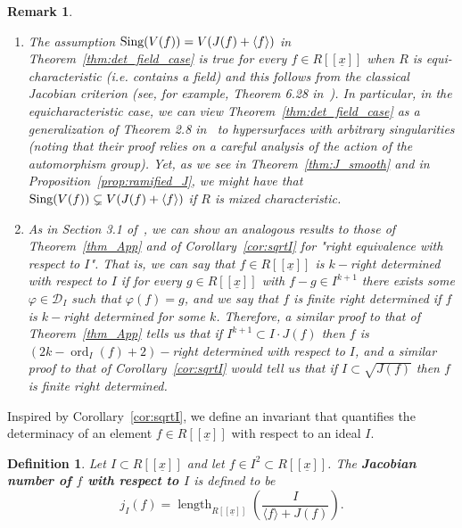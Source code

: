 \documentclass{article}
\newtheorem{definition}[theorem]{Definition}
\newtheorem{remark}[theorem]{Remark}
\DeclareMathOperator{\ord}{ord}
\DeclareMathOperator{\length}{length}
\numberwithin{theorem}{section}
\begin{document}
\begin{remark}
\begin{enumerate}
    \item \textup{The assumption $\textup{Sing}(V(f)) = V(J(f) + \langle f \rangle)$ in Theorem~\ref{thm:det_field_case} is true for every $f \in R[[\underline{x}]]$ when $R$ is equi-characteristic (i.e. contains a field) and this follows from the classical Jacobian criterion (see, for example, Theorem 6.28 in~\cite{gortz2010algebraic}). In particular, in the equicharacteristic case, we can view Theorem~\ref{thm:det_field_case} as a generalization of Theorem 2.8 in~\cite{boubakri2012invariants} to hypersurfaces with arbitrary singularities (noting that their proof relies on a careful analysis of the action of the automorphism group). Yet, as we see in Theorem~\ref{thm:J_smooth} and in Proposition~\ref{prop:ramified_J}, we might have that $\textup{Sing}(V(f)) \subsetneq V(J(f) + \langle f \rangle)$ if $R$ is mixed characteristic.  }
    \item \textup{As in Section 3.1 of~\cite{boubakri2009hypersurface}, we can show an analogous results to those of Theorem~\ref{thm_App} and of Corollary~\ref{cor:sqrtI} for "right equivalence with respect to $I$". That is, we can say that $f \in R[[\underline{x}]]$ is $k-$right determined with respect to $I$ if for every $g \in R[[\underline{x}]]$ with $f-g \in I^{k+1}$ there exists some $\varphi \in \mathcal{D}_I$ such that $\varphi(f)=g$, and we say that $f$ is finite right determined if $f$ is $k-$right determined for some $k$. Therefore, a similar proof to that of Theorem~\ref{thm_App} tells us that if $I^{k+1} \subset I \cdot J(f)$ then $f$ is $(2k-\ord_I(f)+2)-$right determined with respect to $I$, and a similar proof to that of Corollary~\ref{cor:sqrtI} would tell us that if $I \subset \sqrt{J(f)}$ then $f$ is finite right determined.  }
\end{enumerate}
\end{remark}


Inspired by Corollary~\ref{cor:sqrtI}, we define an invariant that quantifies the determinacy of an element $f \in R[[\underline{x}]]$ with respect to an ideal $I$. 


\begin{definition}
    Let $I \subset R[[\underline{x}]]$ and let $f \in I^2 \subset  R[[\underline{x}]]$. The \textbf{Jacobian number of $f$ with respect to $I$}  is defined to be 
    \begin{equation*}
    j_I(f)=\length_{R[[\underline{x}]]} \left(\frac{I}{\langle f \rangle + J(f)}\right). 
    \end{equation*}
\end{definition}
\end{document}
